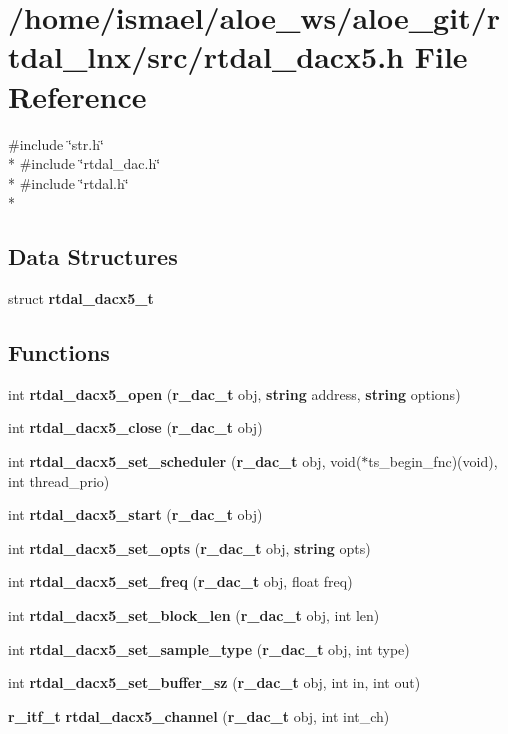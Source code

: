 \section{/home/ismael/aloe\-\_\-ws/aloe\-\_\-git/rtdal\-\_\-lnx/src/rtdal\-\_\-dacx5.h File Reference}
\label{rtdal__dacx5_8h}
{\ttfamily \#include \char`\"{}str.\-h\char`\"{}}\\*
{\ttfamily \#include \char`\"{}rtdal\-\_\-dac.\-h\char`\"{}}\\*
{\ttfamily \#include \char`\"{}rtdal.\-h\char`\"{}}\\*
\subsection*{Data Structures}
\begin{DoxyCompactItemize}
\item 
struct {\bf rtdal\-\_\-dacx5\-\_\-t}
\end{DoxyCompactItemize}
\subsection*{Functions}
\begin{DoxyCompactItemize}
\item 
int {\bf rtdal\-\_\-dacx5\-\_\-open} ({\bf r\-\_\-dac\-\_\-t} obj, {\bf string} address, {\bf string} options)
\item 
int {\bf rtdal\-\_\-dacx5\-\_\-close} ({\bf r\-\_\-dac\-\_\-t} obj)
\item 
int {\bf rtdal\-\_\-dacx5\-\_\-set\-\_\-scheduler} ({\bf r\-\_\-dac\-\_\-t} obj, void($\ast$ts\-\_\-begin\-\_\-fnc)(void), int thread\-\_\-prio)
\item 
int {\bf rtdal\-\_\-dacx5\-\_\-start} ({\bf r\-\_\-dac\-\_\-t} obj)
\item 
int {\bf rtdal\-\_\-dacx5\-\_\-set\-\_\-opts} ({\bf r\-\_\-dac\-\_\-t} obj, {\bf string} opts)
\item 
int {\bf rtdal\-\_\-dacx5\-\_\-set\-\_\-freq} ({\bf r\-\_\-dac\-\_\-t} obj, float freq)
\item 
int {\bf rtdal\-\_\-dacx5\-\_\-set\-\_\-block\-\_\-len} ({\bf r\-\_\-dac\-\_\-t} obj, int len)
\item 
int {\bf rtdal\-\_\-dacx5\-\_\-set\-\_\-sample\-\_\-type} ({\bf r\-\_\-dac\-\_\-t} obj, int type)
\item 
int {\bf rtdal\-\_\-dacx5\-\_\-set\-\_\-buffer\-\_\-sz} ({\bf r\-\_\-dac\-\_\-t} obj, int in, int out)
\item 
{\bf r\-\_\-itf\-\_\-t} {\bf rtdal\-\_\-dacx5\-\_\-channel} ({\bf r\-\_\-dac\-\_\-t} obj, int int\-\_\-ch)
\end{DoxyCompactItemize}


